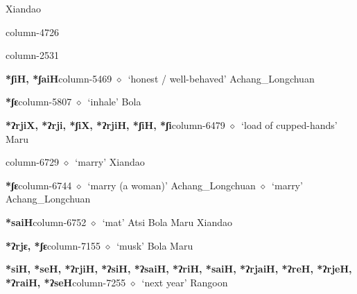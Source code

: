          Xiandao 
  \item {\footnotesize \textbf{}}{\tiny column-4726}
  \item {\footnotesize \textbf{}}{\tiny column-2531}
  \item {\footnotesize \textbf{*ʃiH, *ʃaiH}}{\tiny column-5469}
         $\diamond$~`honest / well-behaved'
         Achang\_Longchuan 
  \item {\footnotesize \textbf{*ʃɛ}}{\tiny column-5807}
         $\diamond$~`inhale'
         Bola 
  \item {\footnotesize \textbf{*ʔrjiX, *ʔrji, *ʃiX, *ʔrjiH, *ʃiH, *ʃi}}{\tiny column-6479}
         $\diamond$~`load of cupped-hands'
         Maru 
  \item {\footnotesize \textbf{}}{\tiny column-6729}
         $\diamond$~`marry'
         Xiandao 
  \item {\footnotesize \textbf{*ʃɛ}}{\tiny column-6744}
         $\diamond$~`marry (a woman)'
         Achang\_Longchuan 
\hspace{1ex}
         $\diamond$~`marry'
         Achang\_Longchuan 
  \item {\footnotesize \textbf{*saiH}}{\tiny column-6752}
         $\diamond$~`mat'
         Atsi 
\hspace{1ex}
         Bola 
\hspace{1ex}
         Maru 
\hspace{1ex}
         Xiandao 
  \item {\footnotesize \textbf{*ʔrjɛ, *ʃɛ}}{\tiny column-7155}
         $\diamond$~`musk'
         Bola 
\hspace{1ex}
         Maru 
  \item {\footnotesize \textbf{*siH, *seH, *ʔrjiH, *ʔsiH, *ʔsaiH, *ʔriH, *saiH, *ʔrjaiH, *ʔreH, *ʔrjeH, *ʔraiH, *ʔseH}}{\tiny column-7255}
         $\diamond$~`next year'
         Rangoon 
\hspace{1ex}

